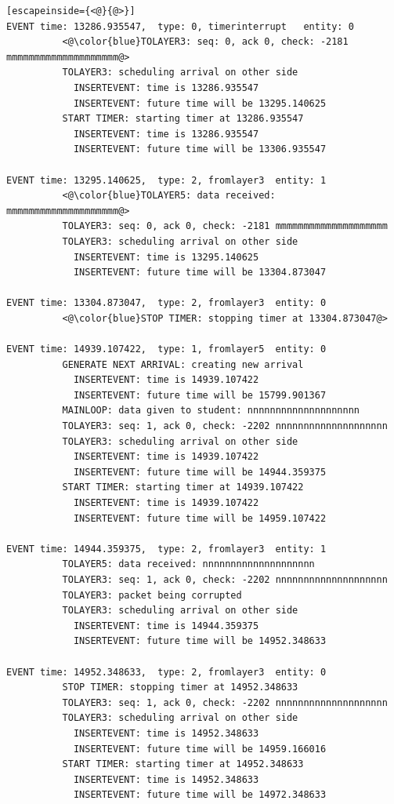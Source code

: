 \documentclass[paper=a4, fontsize=11pt]{scrartcl}
\numberwithin{equation}{section}		%
\numberwithin{figure}{section}			%
\numberwithin{table}{section}				%
\begin{document}
\begin{lstlisting}[escapeinside={<@}{@>}]
EVENT time: 13286.935547,  type: 0, timerinterrupt   entity: 0
          <@\color{blue}TOLAYER3: seq: 0, ack 0, check: -2181 mmmmmmmmmmmmmmmmmmmm@>
          TOLAYER3: scheduling arrival on other side
            INSERTEVENT: time is 13286.935547
            INSERTEVENT: future time will be 13295.140625
          START TIMER: starting timer at 13286.935547
            INSERTEVENT: time is 13286.935547
            INSERTEVENT: future time will be 13306.935547

EVENT time: 13295.140625,  type: 2, fromlayer3  entity: 1
          <@\color{blue}TOLAYER5: data received: mmmmmmmmmmmmmmmmmmmm@>
          TOLAYER3: seq: 0, ack 0, check: -2181 mmmmmmmmmmmmmmmmmmmm
          TOLAYER3: scheduling arrival on other side
            INSERTEVENT: time is 13295.140625
            INSERTEVENT: future time will be 13304.873047

EVENT time: 13304.873047,  type: 2, fromlayer3  entity: 0
          <@\color{blue}STOP TIMER: stopping timer at 13304.873047@>

EVENT time: 14939.107422,  type: 1, fromlayer5  entity: 0
          GENERATE NEXT ARRIVAL: creating new arrival
            INSERTEVENT: time is 14939.107422
            INSERTEVENT: future time will be 15799.901367
          MAINLOOP: data given to student: nnnnnnnnnnnnnnnnnnnn
          TOLAYER3: seq: 1, ack 0, check: -2202 nnnnnnnnnnnnnnnnnnnn
          TOLAYER3: scheduling arrival on other side
            INSERTEVENT: time is 14939.107422
            INSERTEVENT: future time will be 14944.359375
          START TIMER: starting timer at 14939.107422
            INSERTEVENT: time is 14939.107422
            INSERTEVENT: future time will be 14959.107422

EVENT time: 14944.359375,  type: 2, fromlayer3  entity: 1
          TOLAYER5: data received: nnnnnnnnnnnnnnnnnnnn
          TOLAYER3: seq: 1, ack 0, check: -2202 nnnnnnnnnnnnnnnnnnnn
          TOLAYER3: packet being corrupted
          TOLAYER3: scheduling arrival on other side
            INSERTEVENT: time is 14944.359375
            INSERTEVENT: future time will be 14952.348633

EVENT time: 14952.348633,  type: 2, fromlayer3  entity: 0
          STOP TIMER: stopping timer at 14952.348633
          TOLAYER3: seq: 1, ack 0, check: -2202 nnnnnnnnnnnnnnnnnnnn
          TOLAYER3: scheduling arrival on other side
            INSERTEVENT: time is 14952.348633
            INSERTEVENT: future time will be 14959.166016
          START TIMER: starting timer at 14952.348633
            INSERTEVENT: time is 14952.348633
            INSERTEVENT: future time will be 14972.348633


\end{lstlisting}
\end{document}
